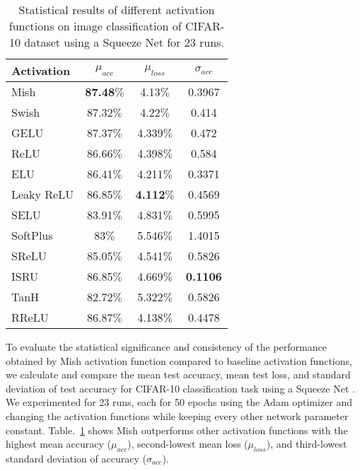 \documentclass{bmvc2k}
\begin{document}
\begin{table}[h]
	\begin{center}
		\begin{tabular}{|l|c|c|c|}
			\hline
			Activation & $\mu_{acc}$ & $\mu_{loss}$ & $\sigma_{acc}$ \\
			\hline\hline
			Mish    & \textbf{87.48$\%$} & 4.13$\%$ & 0.3967 \\
			Swish \cite{ramachandran2017searching} & 87.32$\%$ & 4.22$\%$ & 0.414 \\
			GELU \cite{hendrycks2016gaussian} & 87.37$\%$ & 4.339$\%$ & 0.472 \\
			ReLU \cite{nair2010rectified,krizhevsky2012imagenet} & 86.66$\%$ & 4.398$\%$ & 0.584 \\
			ELU \cite{clevert2015fast} & 86.41$\%$ & 4.211$\%$ & 0.3371 \\
			Leaky ReLU \cite{maas2013rectifier} & 86.85$\%$ & \textbf{4.112$\%$} & 0.4569  \\
			SELU \cite{klambauer2017self} & 83.91$\%$ & 4.831$\%$ & 0.5995 \\
			SoftPlus & 83$\%$ & 5.546$\%$ & 1.4015 \\
			SReLU \cite{jin2016deep} & 85.05$\%$ & 4.541$\%$ & 0.5826 \\
			ISRU \cite{carlile2017improving} & 86.85$\%$ & 4.669$\%$ & \textbf{0.1106}\\
			TanH & 82.72$\%$ & 5.322$\%$ & 0.5826\\
			RReLU \cite{xu2015empirical} & 86.87$\%$ & 4.138$\%$ & 0.4478\\
			\hline
		\end{tabular}
	\end{center}
	\caption{Statistical results of different activation functions on image classification of CIFAR-10 dataset using a Squeeze Net for 23 runs.}
	\label{tab:p-values}
\end{table}

To evaluate the statistical significance and consistency of the performance obtained by Mish activation function compared to baseline activation functions, we calculate and compare the mean test accuracy, mean test loss, and standard deviation of test accuracy for CIFAR-10 \cite{krizhevsky2009learning} classification task using a Squeeze Net \cite{hu2018squeeze}. We experimented for 23 runs, each for 50 epochs using the Adam optimizer \cite{kingma2014adam} and changing the activation functions while keeping every other network parameter constant. Table.~\ref{tab:p-values} shows Mish outperforms other activation functions with the highest mean accuracy ($\mu_{acc}$), second-lowest mean loss ($\mu_{loss}$), and third-lowest standard deviation of accuracy ($\sigma_{acc}$).
\end{document}
